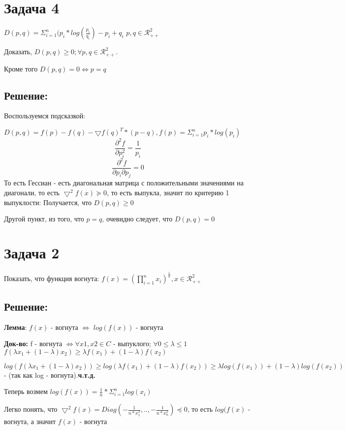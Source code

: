 \documentclass[a4paper]{article}
\begin{document}
\section*{Задача 4}
$D(p, q) = \Sigma_{i=1}^{n}(p_i*log(\frac{p_i}{q_i}) - p_i + q_i$
$p, q \in \mathcal{R}^{2}_{++}$

Доказать, $D(p,q) \geq 0 ; \forall p, q \in \mathcal{R}^{2}_{++}$.

Кроме того $D(p,q) = 0 \Leftrightarrow p = q$
\subsection*{Решение:}
Воспользуемся подсказкой:

$D(p, q) = f(p) - f(q) - \bigtriangledown f(q)^T*(p - q), f(p) = \Sigma_{i=1}^{n}p_i*log(p_i)$
$$\frac{\partial^2 f}{\partial p_i^2} = \frac{1}{p_i}$$
$$\frac{\partial^2 f}{\partial p_i \partial p_j} = 0$$
То есть Гессиан - есть диагональная матрица с положительными значениями на диагонали, то есть $\bigtriangledown^2  f(x) \succeq 0$, то есть выпукла, значит по критерию 1 выпуклости:
Получается, что $D(p, q) \geq 0$

Другой пункт, из того, что $p = q$, очевидно следует, что $D(p,q) = 0$
\section*{Задача 2}
Показать, что функция вогнута: $f(x) = (\prod_{i=1}^{n}x_i)^\frac{1}{n}, x \in \mathcal{R}^2_{++}$
\subsection*{Решение:}
\textbf{Лемма}:
$f(x)$ - вогнута $\Leftrightarrow$ $log(f(x))$ - вогнута

\textbf{Док-во:} f - вогнута $\Leftrightarrow \forall x1, x2 \in C$ - выпуклого; $\forall 0 \leq \lambda \leq 1$ 
$f(\lambda x_1 + (1 - \lambda) x_2) \geq \lambda f(x_1) + (1 - \lambda) f(x_2)$

$log(f(\lambda x_1 + (1 - \lambda) x_2)) \geq log(\lambda f(x_1) + (1 - \lambda) f(x_2)) \geq \lambda log(f(x_1)) + (1 - \lambda) log(f(x_2))$ - (так как log - вогнута).\textbf{ч.т.д.}

Теперь возмем $log(f(x)) = \frac{1}{n}*\Sigma_{i=1}^{n}log(x_i)$

Легко понять, что $\bigtriangledown^2 f(x) = Diag(-\frac{1}{n*x_1^2}, .. , -\frac{1}{n*x_n^2}) \preceq 0$, то есть $log(f(x)$ - вогнута, а значит $f(x)$ - вогнута
\end{document}
